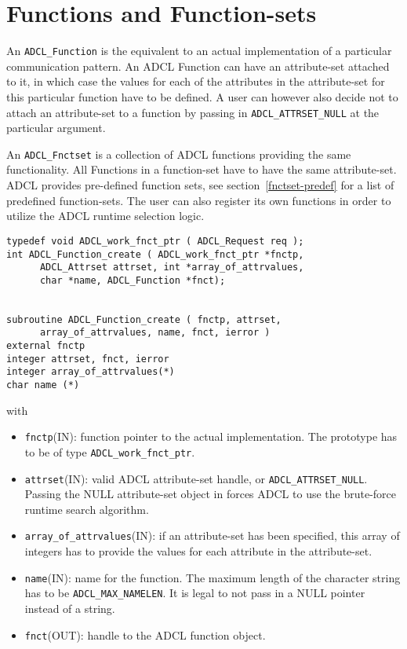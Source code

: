 \section{Functions and Function-sets}

An {\tt ADCL\_Function} is the equivalent to an actual implementation of a particular communication pattern. An ADCL Function can have an attribute-set attached to it, in which case the values for each of the attributes in the attribute-set for this particular function have to be defined. A user can however also decide not to attach an attribute-set to a function by passing in {\tt ADCL\_ATTRSET\_NULL} at the particular argument.

An {\tt ADCL\_Fnctset} is a collection of ADCL functions providing the same functionality. All Functions in a function-set have to have the same attribute-set. ADCL provides pre-defined function sets, see section~\ref{fnctset-predef} for a list of predefined function-sets. The user can also register its own functions in order to utilize the ADCL runtime selection logic.

\begin{verbatim}
typedef void ADCL_work_fnct_ptr ( ADCL_Request req );
int ADCL_Function_create ( ADCL_work_fnct_ptr *fnctp, 
      ADCL_Attrset attrset, int *array_of_attrvalues,  
      char *name, ADCL_Function *fnct);


subroutine ADCL_Function_create ( fnctp, attrset, 
      array_of_attrvalues, name, fnct, ierror )
external fnctp
integer attrset, fnct, ierror
integer array_of_attrvalues(*)
char name (*)	                                

\end{verbatim}
with
\begin{itemize}
\item {\tt fnctp}(IN): function pointer to the actual implementation. The prototype has
     to be of type {\tt ADCL\_work\_fnct\_ptr}.
\item {\tt attrset}(IN): valid ADCL attribute-set handle, or {\tt ADCL\_ATTRSET\_NULL}. Passing the NULL attribute-set 
   object in forces ADCL to use the brute-force runtime search algorithm.
\item {\tt array\_of\_attrvalues}(IN): if an attribute-set has been specified, this array of
 integers has to provide the values for each attribute in the attribute-set. 
\item {\tt name}(IN): name for the function. The maximum length of the character string has to be 
  {\tt ADCL\_MAX\_NAMELEN}. It is legal to not pass in a NULL pointer instead of a string.
\item {\tt fnct}(OUT): handle to the ADCL function object.
\end{itemize}

